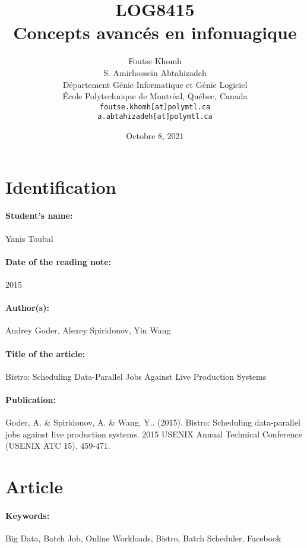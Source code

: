 \documentclass[11pt]{article}
\title{LOG8415\\Concepts avanc\'{e}s en infonuagique}
\author{
    Foutse Khomh \\
    S. Amirhossein Abtahizadeh \\
    D\'{e}partement G\'{e}nie Informatique et G\'{e}nie Logiciel \\
    \'{E}cole Polytechnique de Montr\'{e}al, Qu\'{e}bec, Canada \\
    \texttt{foutse.khomh[at]polymtl.ca} \\
    \texttt{a.abtahizadeh[at]polymtl.ca}
}
\date{Octobre 8, 2021}
\def\titre{Bistro: Scheduling Data-Parallel Jobs Against Live Production Systems
}
\def\auteur{Yanis Toubal}
\begin{document}
\maketitle

\section{Identification}

\paragraph{Student's name:} \auteur

\paragraph{Date of the reading note:} {2015}

\paragraph{Author(s):} {Andrey Goder, Alexey Spiridonov, Yin Wang}

\paragraph{Title of the article:} \titre

\paragraph{Publication:} {Goder, A. \& Spiridonov, A. \& Wang, Y.. (2015). Bistro: Scheduling data-parallel jobs against live production systems. 2015 USENIX Annual Technical Conference (USENIX ATC 15). 459-471. }

\section{Article}

\paragraph{Keywords:} {Big Data, Batch Job, Online Workloads, Bistro, Batch Scheduler, Facebook}
\end{document}
